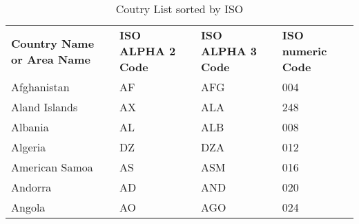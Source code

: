 \documentclass[../main.tex]{subfiles}
\begin{document}
\blindtext

\begin{table}[h]
\begin{tabular}{ |p{3cm}|p{4cm}|p{4cm}|p{3cm}|  }
\hline
\rowcolor{lightgray} \multicolumn{4}{|c|}{\bf Country List} \\
\hline
\bf Country Name or Area Name&\bf ISO ALPHA 2 Code &\bf ISO ALPHA 3 Code&\bf ISO numeric Code \\
\hline
\hline
Afghanistan   & AF    &AFG&   004\\
Aland Islands&   AX  & ALA   &248\\
Albania &AL & ALB&  008\\
Algeria    &DZ & DZA&  012\\
American Samoa&   AS  & ASM&016\\
Andorra& AD  & AND   &020\\
Angola& AO  & AGO&024\\
\hline
\end{tabular}
\caption{Coutry List sorted by ISO}
\label{table:1}
\end{table}
\end{document}
